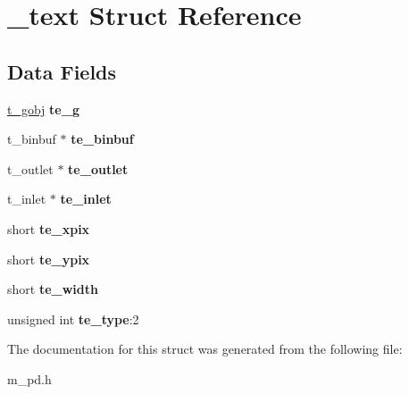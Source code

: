 \hypertarget{struct__text}{}\section{\+\_\+text Struct Reference}
\label{struct__text}
\subsection*{Data Fields}
\begin{DoxyCompactItemize}
\item 
\mbox{\label{struct__text_a2a1d03c47dc522ee54abf232b686d967}} 
\hyperlink{struct__gobj}{t\+\_\+gobj} {\bfseries te\+\_\+g}
\item 
\mbox{\label{struct__text_abd723d92731b3203626cd3659d803979}} 
t\+\_\+binbuf $\ast$ {\bfseries te\+\_\+binbuf}
\item 
\mbox{\label{struct__text_abd5fa9b012cb076294ca3a02619b0c08}} 
t\+\_\+outlet $\ast$ {\bfseries te\+\_\+outlet}
\item 
\mbox{\label{struct__text_a974a2ba622d24866ec9ff114cd8b6304}} 
t\+\_\+inlet $\ast$ {\bfseries te\+\_\+inlet}
\item 
\mbox{\label{struct__text_abfa7d8a29cf174c52ff21e300bbc6024}} 
short {\bfseries te\+\_\+xpix}
\item 
\mbox{\label{struct__text_a1b09541116146f438ed8967942e375e0}} 
short {\bfseries te\+\_\+ypix}
\item 
\mbox{\label{struct__text_a5b41ab2c4ac78a6337d9b3c9439c46ff}} 
short {\bfseries te\+\_\+width}
\item 
\mbox{\label{struct__text_af7108f5ddfff3bb67e5c350d29ceb9a5}} 
unsigned int {\bfseries te\+\_\+type}\+:2
\end{DoxyCompactItemize}


The documentation for this struct was generated from the following file\+:\begin{DoxyCompactItemize}
\item 
m\+\_\+pd.\+h\end{DoxyCompactItemize}
